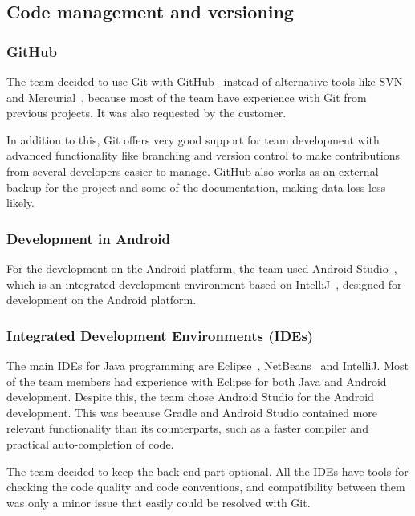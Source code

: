 \subsection{Code management and versioning}
\subsubsection{GitHub}
The team decided to use Git with GitHub~\cite{github} instead of alternative tools like SVN~\cite{svn} and Mercurial~\cite{mercurial}, because most of the team have experience with Git from previous projects. It was also requested by the customer. 

In addition to this, Git offers very good support for team development with advanced functionality like branching and version control to make contributions from several developers easier to manage. GitHub also works as an external backup for the project and some of the documentation, making data loss less likely.

\subsubsection{Development in Android}
For the development on the Android platform, the team used Android Studio~\cite{android-studio}, which is an integrated development environment based on IntelliJ~\cite{intellij}, designed for development on the Android platform.

\subsubsection{Integrated Development Environments (IDEs)}
The main IDEs for Java programming are Eclipse~\cite{eclipse}, NetBeans~\cite{netbeans} and IntelliJ. Most of the team members had experience with Eclipse for both Java and Android development. Despite this, the team chose Android Studio for the Android development. This was because Gradle and Android Studio contained more relevant functionality than its counterparts, such as a faster compiler and practical auto-completion of code.%

The team decided to keep the back-end part optional. All the IDEs have tools for checking the code quality and code conventions, and compatibility between them was only a minor issue that easily could be resolved with Git.


